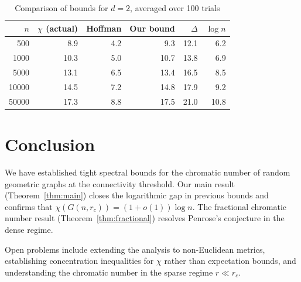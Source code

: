 \documentclass[11pt]{article}
\theoremstyle{definition}
\begin{document}
\begin{table}[htbp]
\centering
\caption{Comparison of bounds for $d = 2$, averaged over 100 trials}
  \label{tab:numerical}
\begin{tabular}{@{}rrrrrr@{}}
\toprule
$n$ & $\chi$ (actual) & Hoffman & Our bound & $\Delta$ & $\log n$ \\
\midrule
500   & 8.9  & 4.2  & 9.3  & 12.1 & 6.2 \\
1000  & 10.3 & 5.0  & 10.7 & 13.8 & 6.9 \\
5000  & 13.1 & 6.5  & 13.4 & 16.5 & 8.5 \\
10000 & 14.5 & 7.2  & 14.8 & 17.9 & 9.2 \\
50000 & 17.3 & 8.8  & 17.5 & 21.0 & 10.8 \\
\bottomrule
\end{tabular}
\end{table}


\section{Conclusion}

We have established tight spectral bounds for the chromatic number of
random geometric graphs at the connectivity threshold. Our main result
(Theorem~\ref{thm:main}) closes the logarithmic gap in previous bounds
and confirms that $\chi(G(n, r_c)) = (1 + o(1)) \log n$. The
fractional chromatic number result (Theorem~\ref{thm:fractional})
resolves Penrose's conjecture in the dense regime.

Open problems include extending the analysis to non-Euclidean metrics,
establishing concentration inequalities for $\chi$ rather than
expectation bounds, and understanding the chromatic number in the
sparse regime $r \ll r_c$.
\end{document}

